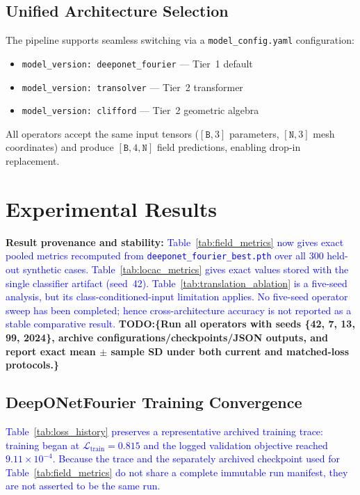\documentclass[journal]{IEEEtran}
\newcommand{\added}[1]{\textcolor{blue}{#1}}
\newcommand{\todo}[1]{\textcolor{green!50!black}{\textbf{TODO:\{#1\}}}}
\begin{document}
\subsection{Unified Architecture Selection}

The pipeline supports seamless switching via a \texttt{model\_config.yaml} configuration:
\begin{itemize}
    \item \texttt{model\_version: deeponet\_fourier} --- Tier~1 default
    \item \texttt{model\_version: transolver} --- Tier~2 transformer
    \item \texttt{model\_version: clifford} --- Tier~2 geometric algebra
\end{itemize}
All operators accept the same input tensors ($[\texttt{B},3]$ parameters, $[\texttt{N},3]$ mesh coordinates) and produce $[\texttt{B},4,\texttt{N}]$ field predictions, enabling drop-in replacement.

\section{Experimental Results}
\label{sec:results}

\textbf{Result provenance and stability:}  \added{Table~\ref{tab:field_metrics} now gives exact pooled metrics recomputed from \texttt{deeponet\_fourier\_best.pth} over all 300 held-out synthetic cases. Table~\ref{tab:locac_metrics} gives exact values stored with the single classifier artifact (seed~42). Table~\ref{tab:translation_ablation} is a five-seed analysis, but its class-conditioned-input limitation applies. No five-seed operator sweep has been completed; hence cross-architecture accuracy is not reported as a stable comparative result.} \todo{Run all operators with seeds \{42, 7, 13, 99, 2024\}, archive configurations/checkpoints/JSON outputs, and report exact mean $\pm$ sample SD under both current and matched-loss protocols.}

\subsection{DeepONetFourier Training Convergence}

\added{Table~\ref{tab:loss_history} preserves a representative archived training trace: training began at $\mathcal{L}_\text{train}=0.815$ and the logged validation objective reached $9.11\times10^{-4}$. Because the trace and the separately archived checkpoint used for Table~\ref{tab:field_metrics} do not share a complete immutable run manifest, they are not asserted to be the same run.}
\end{document}
